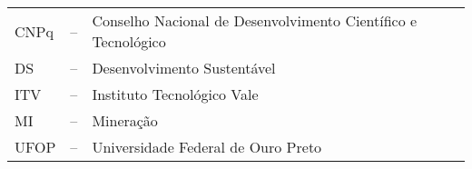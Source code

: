 

\begin{table}[h]
    \begin{tabular}{lcl}
        CNPq & – & Conselho Nacional de Desenvolvimento Científico e Tecnológico \\
        DS & – & Desenvolvimento Sustentável \\
        ITV & – & Instituto Tecnológico Vale \\
        MI & – & Mineração \\
        UFOP & – & Universidade Federal de Ouro Preto
    \end{tabular}
\end{table}

